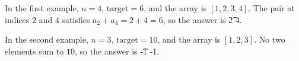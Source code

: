 In the first example, $n = 4$, $\text{target} = 6$, and the array is $[1, 2, 3, 4]$. The pair at indices $2$ and $4$ satisfies $a_2 + a_4 = 2 + 4 = 6$, so the answer is \t{2 4}.

In the second example, $n = 3$, $\text{target} = 10$, and the array is $[1, 2, 3]$. No two elements sum to $10$, so the answer is \t{-1 -1}.
